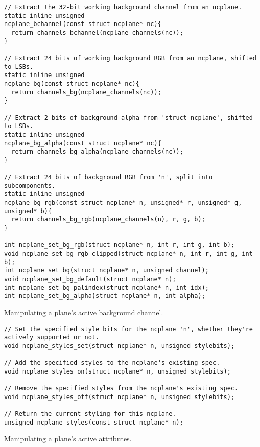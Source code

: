 \begin{listing}[!htb]
\begin{verbatim}
// Extract the 32-bit working background channel from an ncplane.
static inline unsigned
ncplane_bchannel(const struct ncplane* nc){
  return channels_bchannel(ncplane_channels(nc));
}

// Extract 24 bits of working background RGB from an ncplane, shifted to LSBs.
static inline unsigned
ncplane_bg(const struct ncplane* nc){
  return channels_bg(ncplane_channels(nc));
}

// Extract 2 bits of background alpha from 'struct ncplane', shifted to LSBs.
static inline unsigned
ncplane_bg_alpha(const struct ncplane* nc){
  return channels_bg_alpha(ncplane_channels(nc));
}

// Extract 24 bits of background RGB from 'n', split into subcomponents.
static inline unsigned
ncplane_bg_rgb(const struct ncplane* n, unsigned* r, unsigned* g, unsigned* b){
  return channels_bg_rgb(ncplane_channels(n), r, g, b);
}

int ncplane_set_bg_rgb(struct ncplane* n, int r, int g, int b);
void ncplane_set_bg_rgb_clipped(struct ncplane* n, int r, int g, int b);
int ncplane_set_bg(struct ncplane* n, unsigned channel);
void ncplane_set_bg_default(struct ncplane* n);
int ncplane_set_bg_palindex(struct ncplane* n, int idx);
int ncplane_set_bg_alpha(struct ncplane* n, int alpha);
\end{verbatim}
\caption{Manipulating a plane's active background channel.}
\label{listing:planebg}
\end{listing}

\begin{listing}[!htb]
\begin{verbatim}
// Set the specified style bits for the ncplane 'n', whether they're actively supported or not.
void ncplane_styles_set(struct ncplane* n, unsigned stylebits);

// Add the specified styles to the ncplane's existing spec.
void ncplane_styles_on(struct ncplane* n, unsigned stylebits);

// Remove the specified styles from the ncplane's existing spec.
void ncplane_styles_off(struct ncplane* n, unsigned stylebits);

// Return the current styling for this ncplane.
unsigned ncplane_styles(const struct ncplane* n);
\end{verbatim}
\caption{Manipulating a plane's active attributes.}
\label{listing:planeattr}
\end{listing}

